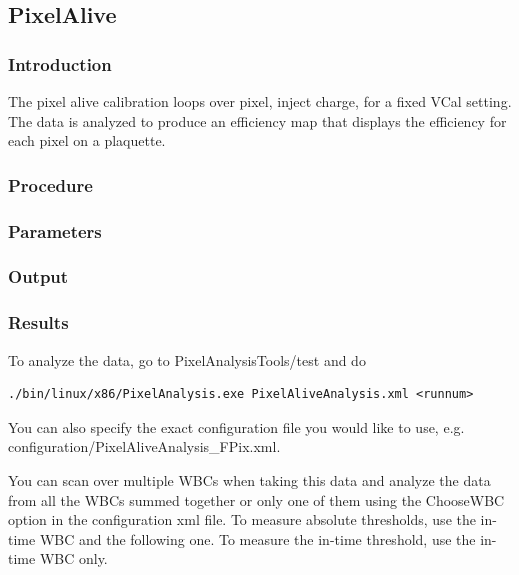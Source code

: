 


\subsection{PixelAlive}
\label{sec:PixelAliveCalib}
\subsubsection{Introduction}
The pixel alive calibration loops over pixel, inject charge, for a fixed VCal setting. The data is analyzed to produce an efficiency map that displays the efficiency for each pixel on a plaquette.

\subsubsection{Procedure}
\subsubsection{Parameters}
\subsubsection{Output}
\subsubsection{Results}

To analyze the data, go to PixelAnalysisTools/test and do
\begin{verbatim}
./bin/linux/x86/PixelAnalysis.exe PixelAliveAnalysis.xml <runnum>
\end{verbatim}
You can also specify the exact configuration file you would like to use, e.g. configuration/PixelAliveAnalysis\_FPix.xml.

You can scan over multiple WBCs when taking this data and analyze the data from all the WBCs summed together or only one of them using the ChooseWBC option in the configuration xml file. To measure absolute thresholds, use the in-time WBC and the following one.  To measure the in-time threshold, use the in-time WBC only.

